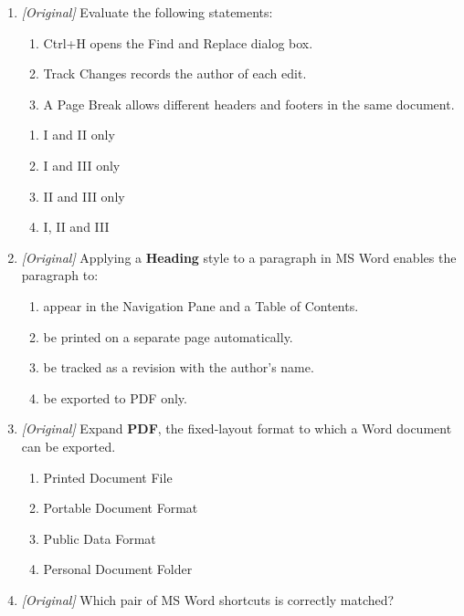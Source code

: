 \begin{enumerate}[label=\textbf{Q\arabic*.}, leftmargin=*]
\begin{enumerate}[label=\Alph*.]
    \item the printer used to print the document.
    \item the file name of the document only.
  \end{enumerate}
\item \textit{[Original]} Evaluate the following statements:
  \begin{enumerate}[label=\Roman*.]
    \item Ctrl+H opens the Find and Replace dialog box.
    \item Track Changes records the author of each edit.
    \item A Page Break allows different headers and footers in the same
      document.
  \end{enumerate}
  \begin{enumerate}[label=\Alph*.]
    \item I and II only
    \item I and III only
    \item II and III only
    \item I, II and III
  \end{enumerate}
\item \textit{[Original]} Applying a \textbf{Heading} style to a paragraph in
  MS Word enables the paragraph to:
  \begin{enumerate}[label=\Alph*.]
    \item appear in the Navigation Pane and a Table of Contents.
    \item be printed on a separate page automatically.
    \item be tracked as a revision with the author's name.
    \item be exported to PDF only.
  \end{enumerate}
\item \textit{[Original]} Expand \textbf{PDF}, the fixed-layout format to which
  a Word document can be exported.
  \begin{enumerate}[label=\Alph*.]
    \item Printed Document File
    \item Portable Document Format
    \item Public Data Format
    \item Personal Document Folder
  \end{enumerate}
\item \textit{[Original]} Which pair of MS Word shortcuts is correctly matched?
  \begin{enumerate}[label=\Alph*.]

\end{enumerate}
\end{enumerate}
